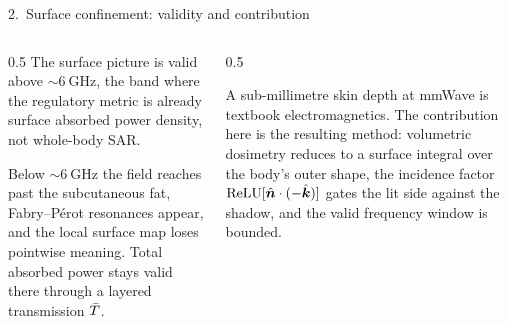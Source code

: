 \documentclass[aspectratio=169, 11pt]{beamer}
\begin{document}
\begin{frame}{2.\ Surface confinement: validity and contribution}
  \begin{columns}[T]
    \begin{column}{0.5\textwidth}
      \vspace{2pt}
      The surface picture is valid above ${\sim}\SI{6}{\giga\hertz}$, the band where
      the regulatory metric is already surface absorbed power density, not
      whole-body SAR.
      \vspace{6pt}

      Below ${\sim}\SI{6}{\giga\hertz}$ the field reaches past the subcutaneous fat,
      Fabry--P\'erot resonances appear, and the local surface map loses pointwise
      meaning. Total absorbed power stays valid there through a layered
      transmission $\bar{T}$.
    \end{column}
    \begin{column}{0.5\textwidth}
      \vspace{2pt}
      \begin{honestbox}
        {\footnotesize
        A sub-millimetre skin depth at mmWave is textbook electromagnetics. The
        contribution here is the resulting method: volumetric dosimetry reduces to a
        surface integral over the body's outer shape, the incidence factor
        $\operatorname{ReLU}[\hat{\bm{n}}\cdot(-\hat{\bm{k}})]$ gates the lit side against the shadow, and the
        valid frequency window is bounded.}
      \end{honestbox}
    \end{column}
  \end{columns}
\end{frame}
\end{document}
